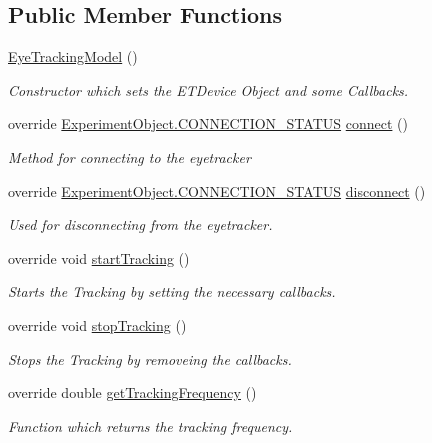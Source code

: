 \subsection*{Public Member Functions}
\begin{DoxyCompactItemize}
\item 
\hyperlink{class_web_analyzer_1_1_eye_tracking_1_1_eye_tracking_model_a6be62a4dc74db08b88c80aa8603a06e2}{Eye\+Tracking\+Model} ()
\begin{DoxyCompactList}\small\item\em Constructor which sets the E\+T\+Device Object and some Callbacks. \end{DoxyCompactList}\item 
override \hyperlink{class_web_analyzer_1_1_u_i_1_1_interaction_objects_1_1_experiment_object_a2875208b4f4b0ed643593152f4ec025c}{Experiment\+Object.\+C\+O\+N\+N\+E\+C\+T\+I\+O\+N\+\_\+\+S\+T\+A\+T\+U\+S} \hyperlink{class_web_analyzer_1_1_eye_tracking_1_1_eye_tracking_model_a24496245bd949730f0f56d328ff74690}{connect} ()
\begin{DoxyCompactList}\small\item\em Method for connecting to the eyetracker \end{DoxyCompactList}\item 
override \hyperlink{class_web_analyzer_1_1_u_i_1_1_interaction_objects_1_1_experiment_object_a2875208b4f4b0ed643593152f4ec025c}{Experiment\+Object.\+C\+O\+N\+N\+E\+C\+T\+I\+O\+N\+\_\+\+S\+T\+A\+T\+U\+S} \hyperlink{class_web_analyzer_1_1_eye_tracking_1_1_eye_tracking_model_a8282209f61b0a45f09551ffe72cab136}{disconnect} ()
\begin{DoxyCompactList}\small\item\em Used for disconnecting from the eyetracker. \end{DoxyCompactList}\item 
override void \hyperlink{class_web_analyzer_1_1_eye_tracking_1_1_eye_tracking_model_a73bde5a5915a3a33a368e5bdf1b203ca}{start\+Tracking} ()
\begin{DoxyCompactList}\small\item\em Starts the Tracking by setting the necessary callbacks. \end{DoxyCompactList}\item 
override void \hyperlink{class_web_analyzer_1_1_eye_tracking_1_1_eye_tracking_model_ae65a98fe8a1ccd24838f7af022edd174}{stop\+Tracking} ()
\begin{DoxyCompactList}\small\item\em Stops the Tracking by removeing the callbacks. \end{DoxyCompactList}\item 
override double \hyperlink{class_web_analyzer_1_1_eye_tracking_1_1_eye_tracking_model_a974f53dd33c205cf772d98eeb7adddd0}{get\+Tracking\+Frequency} ()
\begin{DoxyCompactList}\small\item\em Function which returns the tracking frequency. \end{DoxyCompactList}\end{DoxyCompactItemize}
